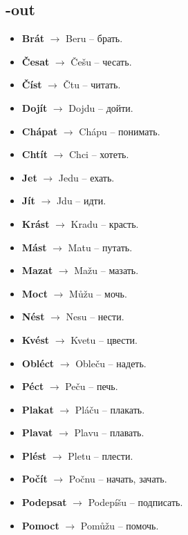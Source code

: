 \documentclass[12pt]{book}
\begin{document}
\subsection{-out}
\begin{itemize}
    \item \textbf{Brát} $\rightarrow$ Beru -- \textrussian{брать}.
    \item \textbf{Česat} $\rightarrow$ Češu -- \textrussian{чесать}.
    \item \textbf{Číst} $\rightarrow$ Čtu -- \textrussian{читать}.
    \item \textbf{Dojít} $\rightarrow$ Dojdu -- \textrussian{дойти}.
    \item \textbf{Chápat} $\rightarrow$ Chápu -- \textrussian{понимать}.
    \item \textbf{Chtít} $\rightarrow$ Chci -- \textrussian{хотеть}.
    \item \textbf{Jet} $\rightarrow$ Jedu -- \textrussian{ехать}.
    \item \textbf{Jít} $\rightarrow$ Jdu -- \textrussian{идти}.
    \item \textbf{Krást} $\rightarrow$ Kradu -- \textrussian{красть}.
    \item \textbf{Mást} $\rightarrow$ Matu -- \textrussian{путать}.
    \item \textbf{Mazat} $\rightarrow$ Mažu -- \textrussian{мазать}.
    \item \textbf{Moct} $\rightarrow$ Můžu -- \textrussian{мочь}.
    \item \textbf{Nést} $\rightarrow$ Nesu -- \textrussian{нести}.
    \item \textbf{Kvést} $\rightarrow$ Kvetu -- \textrussian{цвести}.
    \item \textbf{Obléct} $\rightarrow$ Obleču -- \textrussian{надеть}.
    \item \textbf{Péct} $\rightarrow$ Peču -- \textrussian{печь}.
    \item \textbf{Plakat} $\rightarrow$ Pláču -- \textrussian{плакать}.
    \item \textbf{Plavat} $\rightarrow$ Plavu -- \textrussian{плавать}.
    \item \textbf{Plést} $\rightarrow$ Pletu -- \textrussian{плести}.
    \item \textbf{Počít} $\rightarrow$ Počnu -- \textrussian{начать, зачать}.
    \item \textbf{Podepsat} $\rightarrow$ Podepíšu -- \textrussian{подписать}.
    \item \textbf{Pomoct} $\rightarrow$ Pomůžu -- \textrussian{помочь}.

\end{itemize}
\end{document}
